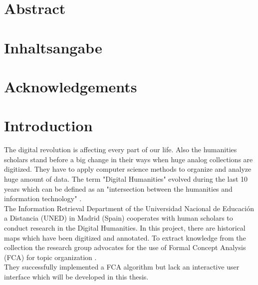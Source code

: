 \documentclass[11pt]{report}
\begin{document}


\newpage
\thispagestyle{empty}
\mbox{}

\chapter*{Abstract}
\blindtext

\newpage
\thispagestyle{empty}
\mbox{}

\chapter*{Inhaltsangabe}
\blindtext

\newpage
\thispagestyle{empty}
\mbox{}

\chapter*{Acknowledgements}
\blindtext

\newpage
\thispagestyle{empty}
\mbox{}

\tableofcontents
\newpage

\newpage
\thispagestyle{empty}
\mbox{}

\chapter{Introduction}

The digital revolution is affecting every part of our life. Also the humanities scholars stand before a big change in their ways when huge analog collections are digitized. They have to apply computer science methods to organize and analyze huge amount of data. The term "Digital Humanities" evolved during the last 10 years which can be defined as an "intersection between the humanities and information technology" \cite{Svensson2010}.\\

 The Information Retrieval Department of the Universidad Nacional de Educación a Distancia (UNED) in Madrid (Spain) cooperates with human scholars to conduct research in the Digital Humanities. In this project, there are historical maps which have been digitized and annotated. To extract knowledge from the collection the research group advocates for the use of Formal Concept Analysis (FCA) for topic organization \cite{Castellanos,Cigarran}.\\
 
 They successfully implemented a FCA algorithm but lack an interactive user interface which will be developed in this thesis. \\
   
\end{document}
